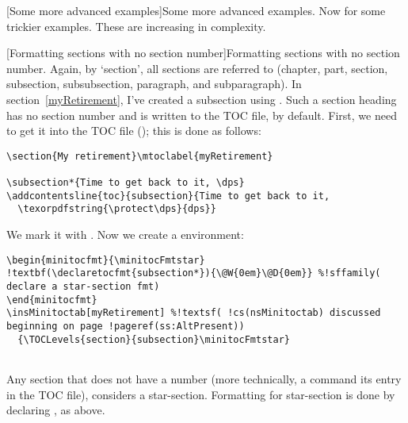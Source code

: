 \documentclass[10pt]{article}
\makeatletter
\renewcommand*{\theparagraph}{\texorpdfstring{\protect\P}{\textparagraph}}
\renewcommand*{\thesubparagraph}{\texorpdfstring{\protect\P\protect\P}{\textparagraph\textparagraph}}
\renewcommand{\paragraph}
    {\renewcommand{\@seccntformat}[1]{\theparagraph\space}%
    \@startsection{paragraph}{4}{0pt}{6pt}{-3pt}{\bfseries}}
\renewcommand{\subparagraph}
    {\renewcommand{\@seccntformat}[1]{\thesubparagraph\space}%
    \@startsection{subparagraph}{5}{\parindent}{6pt}{-3pt}{\bfseries}}
\edef\amtIndent{\the\parindent}
\def\dps{$\hbox{$\mathfrak D$\kern-.3em\hbox{$\mathfrak P$}%
   \kern-.6em \hbox{$\mathcal S$}}$}
\def\dps{$\mbox{$\mathfrak D$\kern-.3em\mbox{$\mathfrak P$}%
   \kern-.6em \hbox{$\mathcal S$}}$}
\newcommand{\insMinitoctab}[2][]{%
  \begin{center}#2
  \begin{tabular}{c}\toprule
  \begin{minipage}[c]{0.8\linewidth}
  \insertminitoc[#1]
  \end{minipage}\\ \bottomrule
  \end{tabular}
  \end{center}
}
\makeatother
\begin{document}


\paragraph[Some more advanced examples]{Some more advanced examples.}
Now for some trickier examples. These are increasing in complexity.

\subparagraph[Formatting sections with no section number]{Formatting sections
with no section number.}\label{spara:noNums} Again, by `section', all sections are referred to
(chapter, part, section, subsection, subsubsection, paragraph, and
subparagraph). In section~\ref{myRetirement}, I've created a subsection using
. Such a section heading has no section number and is written
to the TOC file, by default. First, we need to get it into the TOC file (); this
is done as follows:
\begin{Verbatim}[xleftmargin=\amtIndent,fontsize=\small]
\section{My retirement}\mtoclabel{myRetirement}

\subsection*{Time to get back to it, \dps}
\addcontentsline{toc}{subsection}{Time to get back to it,
  \texorpdfstring{\protect\dps}{dps}}
\end{Verbatim}
We mark it with . Now we create a  environment:
\begin{Verbatim}[xleftmargin=\amtIndent,fontsize=\small,commandchars=!()]
\begin{minitocfmt}{\minitocFmtstar}
!textbf(\declaretocfmt{subsection*}){\@W{0em}\@D{0em}} %!sffamily( declare a star-section fmt)
\end{minitocfmt}
\insMinitoctab[myRetirement] %!textsf( !cs(nsMinitoctab) discussed beginning on page !pageref(ss:AltPresent))
  {\TOCLevels{section}{subsection}\minitocFmtstar}
\end{Verbatim}
\begin{minitocfmt}{\minitocFmtstar}
\end{minitocfmt}
\insMinitoctab[myRetirement]{\minitocFmtstar}
\newtopic\indent Any section that does not have a number (more technically,
a  command its entry in the TOC file),  considers
a star-section. Formatting for star-section is done by declaring
, as above.
\end{document}
